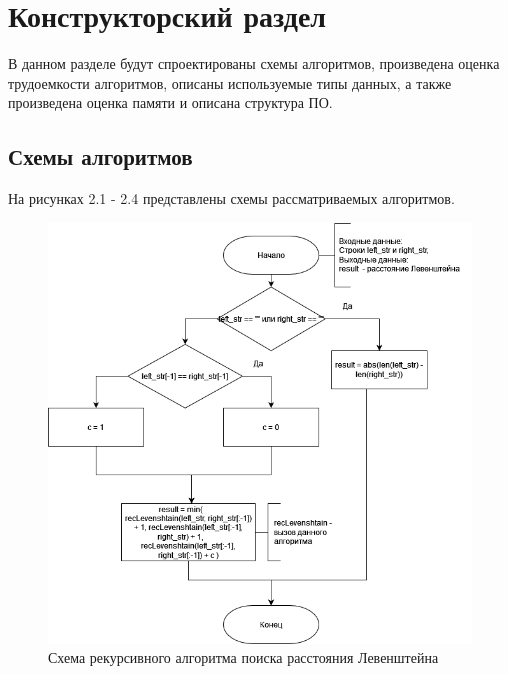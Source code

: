 \chapter{Конструкторский раздел}

В данном разделе будут спроектированы схемы алгоритмов, произведена оценка трудоемкости алгоритмов, описаны используемые типы данных, а также произведена оценка памяти и описана структура ПО.

\section{Схемы алгоритмов}

На рисунках 2.1 - 2.4 представлены схемы рассматриваемых алгоритмов.

\newpage 
\begin{figure}[H]
	\begin{center}
		\includegraphics[scale=0.6]{assets/recLevenshtain.png}
	\end{center}
	\caption{Схема рекурсивного алгоритма поиска расстояния Левенштейна}
\end{figure}

